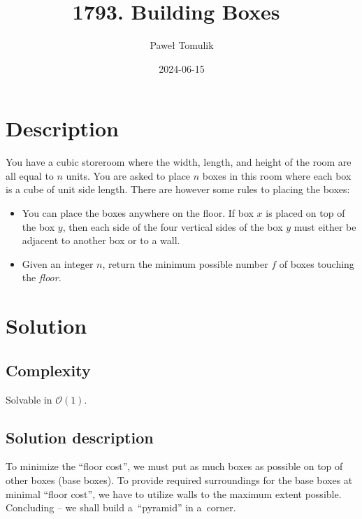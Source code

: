 \documentclass[paper=a4,DIV=12]{leetcode}
\begin{document}
\title{1793. Building Boxes~\cite{leetcode:1739}}
\subtitle{}
\author{Paweł Tomulik}
\date{2024-06-15}
\maketitle

\section{Description}
\label{sec:description}

You have a cubic storeroom where the width, length, and height of the room are
all equal to $n$ units. You are asked to place $n$ boxes in this room where
each box is a cube of unit side length. There are however some rules to placing
the boxes:

\begin{itemize}
  \item You can place the boxes anywhere on the floor. If box $x$ is placed on
    top of the box $y$, then each side of the four vertical sides of the box
    $y$ must either be adjacent to another box or to a wall.

  \item Given an integer $n$, return the minimum possible number $f$ of boxes
    touching the {\em floor}.
\end{itemize}

\section{Solution}
\label{sec:solution}

\subsection{Complexity}
\label{sec:complexity}

Solvable in $\mathcal{O}(1)$.

\subsection{Solution description}
\label{sec:solution-description}

To minimize the ``floor cost'', we must put as much boxes as possible on top of
other boxes (base boxes). To provide required surroundings for the base boxes
at minimal ``floor cost'', we have to utilize walls to the maximum extent
possible. Concluding -- we shall build a~``pyramid'' in a~corner.
\end{document}
